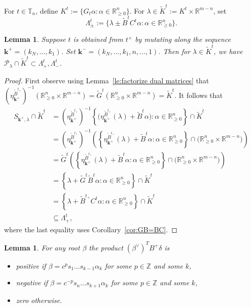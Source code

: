 \documentclass{amsart}
\newtheorem{lemma}[theorem]{Lemma}
\numberwithin{theorem}{section}
\newcommand{\bfk}{{\boldsymbol{k}}}
\newcommand{\cP}{\mathcal{P}}
\newcommand{\RR}{\mathbb{R}}
\newcommand{\TT}{\mathbb{T}}
\newcommand{\ZZ}{\mathbb{Z}}
\begin{document}
  For $t\in\TT_n$, define $K^t:=\{G_t\alpha:\alpha\in\RR_{\ge0}^n\}$.
  For $\lambda \in \widetilde K^t := K^t \times \RR^{m-n}$, set 
  \[\Lambda^t_\pm:=\{\lambda \pm \widetilde B^t C^t\alpha:\alpha\in\RR_{\ge0}^n\}.\]
  \begin{lemma}
    Suppose $t$ is obtained from $t^+$ by mutating along the sequence $\bfk^+=(k_N,\ldots,k_1)$.
    Set $\bfk^-=(k_N,\ldots,k_1,n,\ldots,1)$.
    Then for $\lambda\in \widetilde K^t$, we have $\cP_\lambda\cap \widetilde K^t\subset \Lambda^t_+,\Lambda^t_-$.
  \end{lemma}
  \begin{proof}
    First observe using Lemma~\ref{le:factorize dual matrices} that $\left(\eta^{\widetilde B^{t_+}}_{\bfk^+}\right)^{-1}(\RR_{\ge0}^n\times \RR^{m-n})=\widetilde G^t(\RR_{\ge0}^n\times \RR^{m-n})=\widetilde K^t$.
    It follows that
    \begin{align*}
      S_{\bfk^+,\lambda}\cap \widetilde K^t
      &= \left(\eta^{\widetilde B^{t_+}}_{\bfk^+}\right)^{-1}\left\{\big(\eta^{\widetilde B^{t_+}}_{\bfk^+}(\lambda)+\widetilde B^t\alpha\big):\alpha\in\RR^n_{\ge0}\right\}\cap \widetilde K^t\\
      &= \left(\eta^{\widetilde B^{t_+}}_{\bfk^+}\right)^{-1}\left(\left\{\eta^{\widetilde B^{t_+}}_{\bfk^+}(\lambda)+\widetilde B^t\alpha:\alpha\in\RR^n_{\ge0}\right\}\cap \big( \RR_{\ge0}^n\times \RR^{m-n}\big)\right)\\
      &= \widetilde G^t \left(\left\{\eta^{\widetilde B^{t_+}}_{\bfk^+}(\lambda)+\widetilde B^t\alpha:\alpha\in\RR^n_{\ge0}\right\}\cap \big( \RR_{\ge0}^n\times \RR^{m-n}\big)\right)\\
      &= \left\{\lambda+\widetilde G^t \widetilde B^t\alpha:\alpha\in\RR^n_{\ge0}\right\}\cap \widetilde K^t\\
      &= \left\{\lambda+\widetilde B^{t_+} C^t \alpha:\alpha\in\RR^n_{\ge0}\right\}\cap \widetilde K^t\\
      &\subseteq \Lambda^t_+,
    \end{align*}
    where the last equality uses Corollary~\ref{cor:GB=BC}.
  \end{proof}

  \begin{lemma}
    \label{le:euler pairing}
    For any root $\beta$ the product $(\beta^\vee)^T B^+ \delta$ is
    \begin{itemize}
      \item positive if $\beta = c^p s_1\dots s_{k-1}\alpha_k$ for some $p\in\ZZ$ and some $k$,
      \item negative if $\beta = c^{-p} s_n\dots s_{k+1}\alpha_k$ for some $p\in\ZZ$ and some $k$,
      \item zero otherwise.
    \end{itemize}
  \end{lemma}
\end{document}
